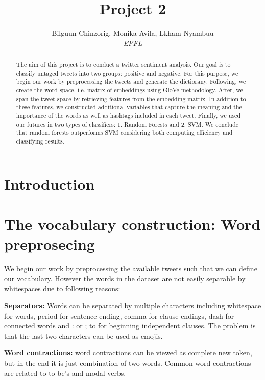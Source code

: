 \documentclass[10pt,conference,compsocconf]{IEEEtran}
\begin{document}
\title{Project 2}

\author{
Bilguun Chinzorig, Monika Avila, Lkham Nyambuu\\
  \textit{EPFL}
}

\maketitle

\begin{abstract}
  The aim of this project is to conduct a twitter sentiment analysis. Our goal is to classify untaged tweets into two groups: positive and negative. 
  For this purpose, we begin our work by preprocessing the tweets and generate the dictiorany. Following, we create the word space, i.e. matrix of embeddings using GloVe methodology. After, we span the tweet space by retrieving features from the embedding matrix. In addition to these features, we constructed additional variables that capture the meaning  and the importance of the words as well as hashtags included in each tweet. Finally, we used our futures in two types of classifiers: 1. Random Forests and 2. SVM. 
  We conclude that random forests outperforms SVM considering both computing efficiency and classifying results. 
\end{abstract}	\textbf{ }

\section{Introduction}



\section{The vocabulary construction: Word preprosecing}

We begin our work by preprocessing the available tweets such that we can define our vocabulary. However the words in the dataset are not easily separable by whitespaces due to following reasons:
	
	\textbf{Separators:} Words can be separated by multiple characters including whitespace for words, period for sentence ending, comma for clause endings, dash for connected words and : or ; to for beginning independent clauses. The problem is that the last two characters can be used as emojis. 

\textbf{Word contractions:} word contractions can be viewed as complete new token, but in the end it is just combination of two words. Common word contractions are related to to be's and modal verbs.
\end{document}
